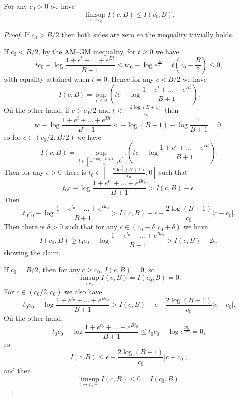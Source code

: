 \documentclass[10pt,a4paper]{amsart}
\begin{document}
\begin{lem}\label{semicont}
For any $c_0 > 0$ we have
\[
\limsup_{c\to c_0} I(c, B) \le I(c_0, B).
\]
\end{lem}

\begin{proof}
If $c_0 > B/2$ then both sides are zero so the inequality trivially holds.

If $c_0 < B/2$, by the AM--GM inequality, for $t \ge 0$ we have
\[
tc_0 - \log \frac{1 + e^t + \dots + e^{Bt}}{B + 1}
\le tc_0 - \log e^{\frac{Bt}2} = t\left( c_0 - \frac B2 \right) \le 0,
\]
with equality attained when $t = 0$. Hence for any $c < B/2$ we have
\[
I(c, B) = \sup_{t\le0} \left( tc - \log \frac{1 + e^t + \dots + e^{Bt}}{B + 1} \right).
\]
On the other hand, if $c > c_0/2$ and $t < -\frac{2\log(B + 1)}{c_0}$ then
\[
tc - \log \frac{1 + e^t + \dots + e^{Bt}}{B + 1}
< -\log(B + 1) - \log\frac1{B + 1} = 0,
\]
so for $c \in (c_0/2, B/2)$ we have
\[
I(c, B) = \sup_{t\in\left[-\frac{2\log(B + 1)}{c_0},0\right]} \left( tc - \log \frac{1 + e^t + \dots + e^{Bt}}{B + 1} \right).
\]
Then for any $\epsilon > 0$ there is $t_0\in\left[-\frac{2\log(B + 1)}{c_0},0\right]$ such that
\[
t_0c - \log \frac{1 + e^{t_0} + \dots + e^{Bt_0}}{B + 1} > I(c, B) - \epsilon.
\]
Then
\[
t_0c_0 - \log \frac{1 + e^{t_0} + \dots + e^{Bt_0}}{B + 1} > I(c, B) - \epsilon - \frac{2\log(B + 1)}{c_0}|c - c_0|.
\]
Then there is $\delta > 0$ such that for any $c \in (c_0 - \delta, c_0 + \delta)$ we have
\[
I(c_0, B) \ge t_0c_0 - \log \frac{1 + e^{t_0} + \dots + e^{Bt_0}}{B + 1} > I(c, B) - 2\epsilon,
\]
showing the claim.

If $c_0 = B/2$, then for any $c \ge c_0$, $I(c, B) = 0$, so
\[
\limsup_{c\to c_0+} I(c, B) = I(c_0, B) = 0.
\]
For $c \in (c_0/2, c_0)$ we also have
\[
t_0c_0 - \log \frac{1 + e^{t_0} + \dots + e^{Bt_0}}{B + 1} > I(c, B) - \epsilon - \frac{2\log(B + 1)}{c_0}|c - c_0|.
\]
On the other hand,
\[
t_0c_0 - \log \frac{1 + e^{t_0} + \dots + e^{Bt_0}}{B + 1} \le t_0c_0 - \log e^{\frac{Bt_0}2} = 0,
\]
so
\[
I(c, B) \le \epsilon + \frac{2\log(B + 1)}{c_0}|c - c_0|,
\]
and then
\[
\limsup_{c\to c_0-} I(c, B) \le 0 = I(c_0, B).
\]
\end{proof}
\end{document}
